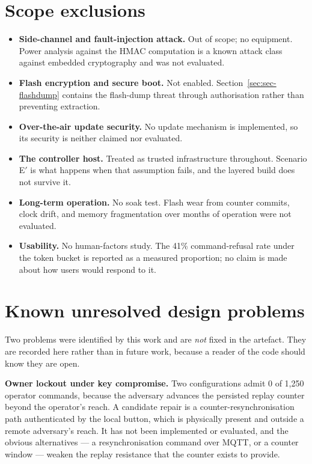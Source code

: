 \section{Scope exclusions}

\begin{itemize}[leftmargin=1.6em,itemsep=4pt]
  \item \textbf{Side-channel and fault-injection attack.} Out of scope; no equipment. Power
        analysis against the HMAC computation is a known attack class against embedded
        cryptography and was not evaluated.
  \item \textbf{Flash encryption and secure boot.} Not enabled. Section~\ref{sec:sec-flashdump}
        contains the flash-dump threat through authorisation rather than preventing extraction.
  \item \textbf{Over-the-air update security.} No update mechanism is implemented, so its
        security is neither claimed nor evaluated.
  \item \textbf{The controller host.} Treated as trusted infrastructure throughout. Scenario
        E$'$ is what happens when that assumption fails, and the layered build does not survive
        it.
  \item \textbf{Long-term operation.} No soak test. Flash wear from counter commits, clock drift,
        and memory fragmentation over months of operation were not evaluated.
  \item \textbf{Usability.} No human-factors study. The 41\% command-refusal rate under the token
        bucket is reported as a measured proportion; no claim is made about how users would
        respond to it.
\end{itemize}

\section{Known unresolved design problems}

Two problems were identified by this work and are \emph{not} fixed in the artefact. They are
recorded here rather than in future work, because a reader of the code should know they are open.

\textbf{Owner lockout under key compromise.} Two configurations admit 0 of 1,250 operator
commands, because the adversary advances the persisted replay counter beyond the operator's reach.
A candidate repair is a counter-resynchronisation path authenticated by the local button, which is
physically present and outside a remote adversary's reach. It has not been implemented or
evaluated, and the obvious alternatives --- a resynchronisation command over MQTT, or a counter
window --- weaken the replay resistance that the counter exists to provide.

